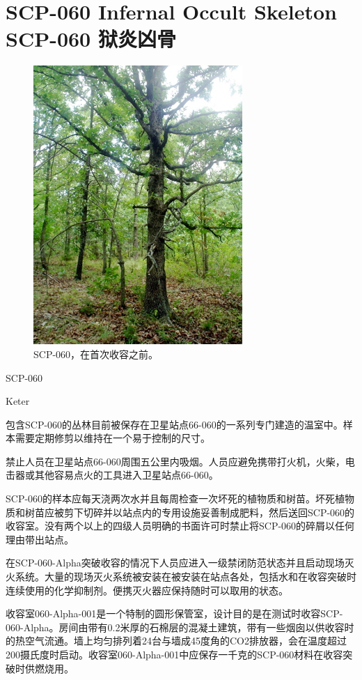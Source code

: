 \chapter[SCP-060 狱炎凶骨]{
    SCP-060 Infernal Occult Skeleton\\
    SCP-060 狱炎凶骨
}

\label{chap:SCP-060}

\begin{figure}[H]
    \centering
    \includegraphics[width=0.5\linewidth]{images/SCP-060.jpg}
    \caption*{SCP-060，在首次收容之前。}
\end{figure}

SCP-060

Keter

包含SCP-060的丛林目前被保存在卫星站点66-060的一系列专门建造的温室中。样本需要定期修剪以维持在一个易于控制的尺寸。

禁止人员在卫星站点66-060周围五公里内吸烟。人员应避免携带打火机，火柴，电击器或其他容易点火的工具进入卫星站点66-060。

SCP-060的样本应每天浇两次水并且每周检查一次坏死的植物质和树苗。坏死植物质和树苗应被剪下切碎并以站点内的专用设施妥善制成肥料，然后送回SCP-060的收容室。没有两个以上的四级人员明确的书面许可时禁止将SCP-060的碎屑以任何理由带出站点。

在SCP-060-Alpha突破收容的情况下人员应进入一级禁闭防范状态并且启动现场灭火系统。大量的现场灭火系统被安装在被安装在站点各处，包括水和在收容突破时连续使用的化学抑制剂。便携灭火器应保持随时可以取用的状态。

收容室060-Alpha-001是一个特制的圆形保管室，设计目的是在测试时收容SCP-060-Alpha。房间由带有0.2米厚的石棉层的混凝土建筑，带有一些烟囱以供收容时的热空气流通。墙上均匀排列着24台与墙成45度角的CO2排放器，会在温度超过200摄氏度时启动。收容室060-Alpha-001中应保存一千克的SCP-060材料在收容突破时供燃烧用。

